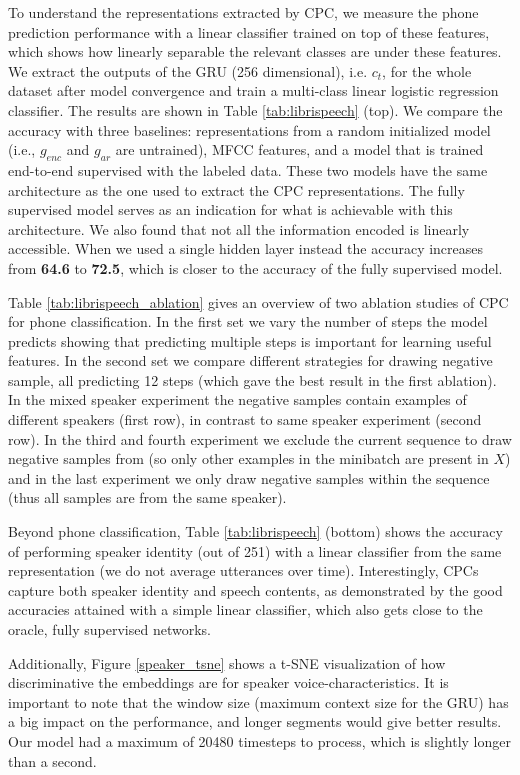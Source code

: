 To understand the representations extracted by CPC, we measure the phone prediction performance with a linear classifier trained on top of these features, which shows how linearly separable the relevant classes are under these features. We extract the outputs of the GRU (256 dimensional), i.e. $c_t$, for the whole dataset after model convergence and train a multi-class linear logistic regression classifier. The results are shown in Table \ref{tab:librispeech} (top). We compare the accuracy with three baselines: representations from a random initialized model (i.e., $g_{enc}$ and $g_{ar}$ are untrained), MFCC features, and a model that is trained end-to-end supervised with the labeled data. These two models have the same architecture as the one used to extract the CPC representations. The fully supervised model serves as an indication for what is achievable with this architecture.
We also found that not all the information encoded is linearly accessible. When we used a single hidden layer instead the accuracy increases from \textbf{64.6} to \textbf{72.5}, which is closer to the accuracy of the fully supervised model.

Table \ref{tab:librispeech_ablation} gives an overview of two ablation studies of CPC for phone classification. In the first set we vary the number of steps the model predicts showing that predicting multiple steps is important for learning useful features. In the second set we compare different strategies for drawing negative sample, all predicting 12 steps (which gave the best result in the first ablation). In the mixed speaker experiment the negative samples contain examples of different speakers (first row), in contrast to same speaker experiment (second row). In the third and fourth experiment we exclude the current sequence to draw negative samples from (so only other examples in the minibatch are present in $X$) and in the last experiment we only draw negative samples within the sequence (thus all samples are from the same speaker).

Beyond phone classification, Table \ref{tab:librispeech} (bottom) shows the accuracy of performing speaker identity (out of 251) with a linear classifier from the same representation (we do not average utterances over time). Interestingly, CPCs capture both speaker identity and speech contents, as demonstrated by the good accuracies attained with a simple linear classifier, which also gets close to the oracle, fully supervised networks.

Additionally, Figure \ref{speaker_tsne} shows a t-SNE visualization \cite{maaten2008visualizing} of how discriminative the embeddings are for speaker voice-characteristics.
It is important to note that the window size (maximum context size for the GRU) has a big impact on the performance, and longer segments would give better results. Our model had a maximum of 20480 timesteps to process, which is slightly longer than a second.

